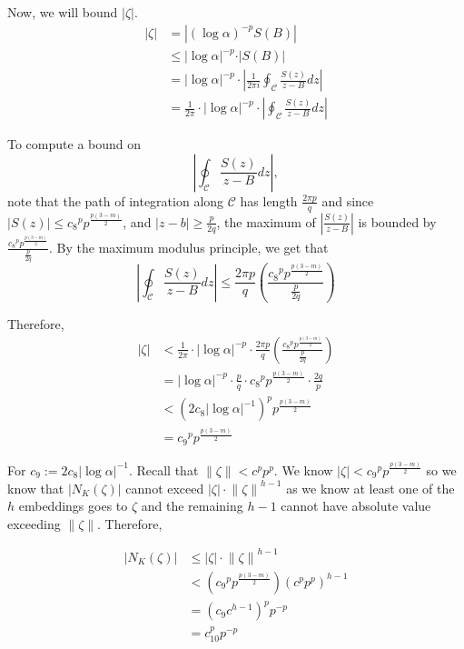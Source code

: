 \documentclass[a4paper, 11pt]{book}
\begin{document}
Now, we will bound $\vert \zeta \vert$.
\begin{align*}
    \vert \zeta \vert &= \left\vert {(\log \alpha)}^{-p} S(B) \right\vert \\
                      &\leq {\vert \log \alpha \vert}^{-p} \cdot \vert S(B) \vert \\
                      &= {\vert \log \alpha \vert}^{-p} \cdot \left\vert \frac{1}{2 \pi i} \oint_{\mathcal{C}} \frac{S(z)}{z-B} dz \right\vert \\
                      &= \frac{1}{2\pi} \cdot {\vert \log \alpha \vert}^{-p} \cdot \left\vert\oint_{\mathcal{C}} \frac{S(z)}{z-B} dz \right\vert 
\end{align*}

To compute a bound on \[\left\vert \oint_{\mathcal{C}} \frac{S(z)}{z-B} dz\right\vert,\] note that the path of integration along $\mathcal{C}$ has length $\frac{2 \pi p}{q}$ and since $\vert S(z) \vert \leq {c_8}^{p}p^{\frac{p(3-m)}{2}}$, and $\vert z - b \vert \geq \frac{p}{2q}$, the maximum of $\left\vert \frac{S(z)}{z-B} \right\vert$ is bounded by $\frac{{c_8}^{p}p^{\frac{p(3-m)}{2}}}{\frac{p}{2q}}$. By the maximum modulus principle, we get that \[\left\vert \oint_{\mathcal{C}} \frac{S(z)}{z-B} dz\right\vert \leq \frac{2 \pi p}{q} \left(\frac{{c_8}^{p}p^{\frac{p(3-m)}{2}}}{\frac{p}{2q}}\right)\]

Therefore, 
\begin{align*}
    \vert \zeta \vert &< \frac{1}{2\pi} \cdot {\vert \log \alpha \vert}^{-p} \cdot \frac{2 \pi p}{q} \left(\frac{{c_8}^{p}p^{\frac{p(3-m)}{2}}}{\frac{p}{2q}}\right)\\
                      &= {\vert \log \alpha \vert}^{-p} \cdot \frac{p}{q} \cdot {c_8}^{p}p^{\frac{p(3-m)}{2}} \cdot \frac{2q}{p} \\
                      &< {\left(2c_8 {\vert \log \alpha \vert}^{-1}\right)}^{p}p^{\frac{p(3-m)}{2}} \\
                      &= {c_9}^{p}{p}^{\frac{p(3-m)}{2}} 
\end{align*}

For $c_9 := 2c_8 {\vert \log \alpha \vert}^{-1}$. Recall that $\| \zeta \| < c^{p}p^{p}$. We know $\vert \zeta \vert < {c_9}^{p}{p}^{\frac{p(3-m)}{2}}$ so we know that $\vert N_K(\zeta) \vert$ cannot exceed $\vert \zeta \vert \cdot {\| \zeta \|}^{h-1}$ as we know at least one of the $h$ embeddings goes to $\zeta$ and the remaining $h-1$ cannot have absolute value exceeding $\| \zeta \|$. Therefore, 

\begin{align*}
    \vert N_K(\zeta) \vert &\leq \vert \zeta \vert \cdot {\| \zeta \|}^{h-1} \\
                           &< \left({c_9}^{p}{p}^{\frac{p(3-m)}{2}}\right){\left(c^{p}p^{p}\right)}^{h-1} \\
                           &= {(c_{9}c^{h-1})}^{p}p^{-p} \\
                           &= {c_{10}^{p}p^{-p}}
\end{align*}
\end{document}
